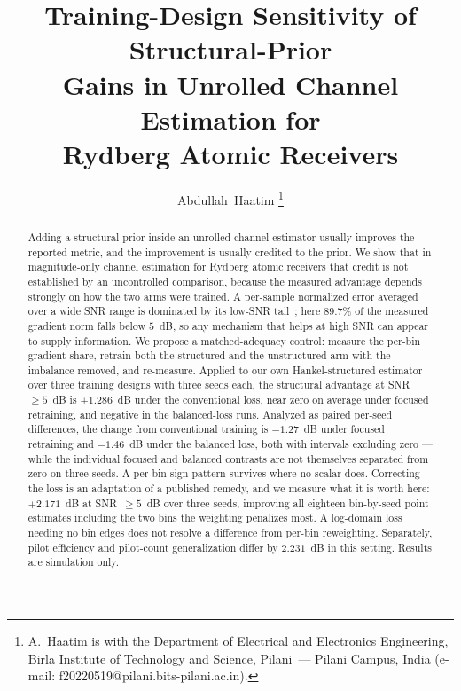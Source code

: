 \documentclass[journal]{IEEEtran}
\begin{document}
\title{Training-Design Sensitivity of Structural-Prior\\
Gains in Unrolled Channel Estimation for\\
Rydberg Atomic Receivers}

\author{Abdullah~Haatim%
\thanks{A.~Haatim is with the Department of Electrical and Electronics
Engineering, Birla Institute of Technology and Science, Pilani~--- Pilani
Campus, India (e-mail:
f20220519@pilani.bits-pilani.ac.in).}}

\maketitle

\begin{abstract}
Adding a structural prior inside an unrolled channel estimator usually improves
the reported metric, and the improvement is usually credited to the prior. We
show that in magnitude-only channel estimation for Rydberg atomic receivers
that credit is not established by an uncontrolled comparison, because the
measured advantage depends strongly on how the two arms were trained. A
per-sample normalized error averaged over a wide SNR range is dominated by its
low-SNR tail~\cite{wiesmayr2023bler}; here $89.7\%$ of the measured gradient
norm falls below $5$~dB, so any mechanism that helps at high SNR can appear to
supply information. We propose a matched-adequacy control: measure the per-bin
gradient share, retrain both the structured and the unstructured arm with the
imbalance removed, and re-measure. Applied to our own Hankel-structured
estimator over three training designs with three seeds each, the structural
advantage at SNR~$\ge5$~dB is $+1.286$~dB under the conventional loss, near
zero on average under focused retraining, and negative in the balanced-loss
runs. Analyzed as paired per-seed differences, the change from conventional
training is $-1.27$~dB under focused retraining and $-1.46$~dB under the
balanced loss, both with intervals excluding zero --- while the individual
focused and balanced contrasts are not themselves separated from zero on three
seeds. A per-bin sign pattern survives where no scalar does. Correcting the
loss is an adaptation of a published remedy, and we measure what it is worth
here: $+2.171$~dB at SNR~$\ge5$~dB over three seeds, improving all eighteen
bin-by-seed point estimates including the two bins the weighting penalizes
most. A log-domain loss needing no bin edges does not resolve a difference from
per-bin reweighting. Separately, pilot efficiency and pilot-count
generalization differ by $2.231$~dB in this setting. Results are simulation
only.
\end{abstract}
\end{document}
